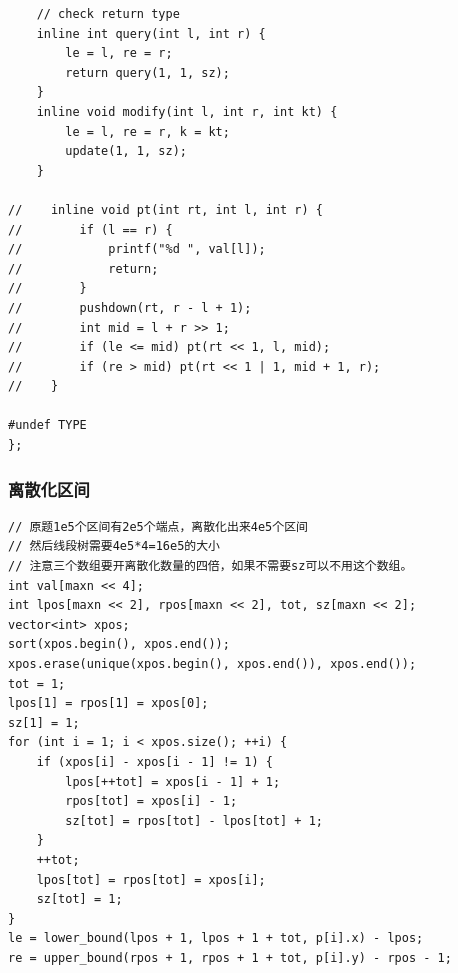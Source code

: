 \documentclass[twoside]{article}
\begin{document}
\begin{lstlisting}
    // check return type
    inline int query(int l, int r) {
        le = l, re = r;
        return query(1, 1, sz);
    }
    inline void modify(int l, int r, int kt) {
        le = l, re = r, k = kt;
        update(1, 1, sz);
    }

//    inline void pt(int rt, int l, int r) {
//        if (l == r) {
//            printf("%d ", val[l]);
//            return;
//        }
//        pushdown(rt, r - l + 1);
//        int mid = l + r >> 1;
//        if (le <= mid) pt(rt << 1, l, mid);
//        if (re > mid) pt(rt << 1 | 1, mid + 1, r);
//    }

#undef TYPE
};
\end{lstlisting}
\subsubsection{离散化区间}
\begin{lstlisting}
// 原题1e5个区间有2e5个端点，离散化出来4e5个区间
// 然后线段树需要4e5*4=16e5的大小
// 注意三个数组要开离散化数量的四倍，如果不需要sz可以不用这个数组。
int val[maxn << 4];
int lpos[maxn << 2], rpos[maxn << 2], tot, sz[maxn << 2];
vector<int> xpos;
sort(xpos.begin(), xpos.end());
xpos.erase(unique(xpos.begin(), xpos.end()), xpos.end());
tot = 1;
lpos[1] = rpos[1] = xpos[0];
sz[1] = 1;
for (int i = 1; i < xpos.size(); ++i) {
    if (xpos[i] - xpos[i - 1] != 1) {
        lpos[++tot] = xpos[i - 1] + 1;
        rpos[tot] = xpos[i] - 1;
        sz[tot] = rpos[tot] - lpos[tot] + 1;
    }
    ++tot;
    lpos[tot] = rpos[tot] = xpos[i];
    sz[tot] = 1;
}
le = lower_bound(lpos + 1, lpos + 1 + tot, p[i].x) - lpos;
re = upper_bound(rpos + 1, rpos + 1 + tot, p[i].y) - rpos - 1;\end{lstlisting}
\end{document}
